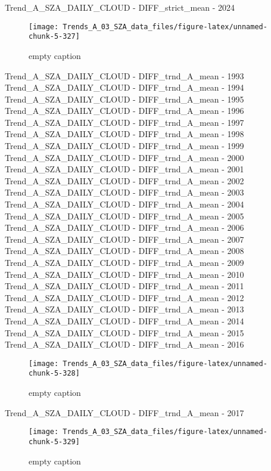 \documentclass[
  10pt,
  a4paper,oneside]{article}
\begin{document}
Trend\_A\_SZA\_DAILY\_CLOUD - DIFF\_strict\_mean - 2024

\begin{figure}[!ht]

{\centering \texttt{[image: Trends\_A\_03\_SZA\_data\_files/figure-latex/unnamed-chunk-5-327]} 

}

\caption{ empty caption }\label{fig:unnamed-chunk-5-327}
\end{figure}

Trend\_A\_SZA\_DAILY\_CLOUD - DIFF\_trnd\_A\_mean - 1993
Trend\_A\_SZA\_DAILY\_CLOUD - DIFF\_trnd\_A\_mean - 1994
Trend\_A\_SZA\_DAILY\_CLOUD - DIFF\_trnd\_A\_mean - 1995
Trend\_A\_SZA\_DAILY\_CLOUD - DIFF\_trnd\_A\_mean - 1996
Trend\_A\_SZA\_DAILY\_CLOUD - DIFF\_trnd\_A\_mean - 1997
Trend\_A\_SZA\_DAILY\_CLOUD - DIFF\_trnd\_A\_mean - 1998
Trend\_A\_SZA\_DAILY\_CLOUD - DIFF\_trnd\_A\_mean - 1999
Trend\_A\_SZA\_DAILY\_CLOUD - DIFF\_trnd\_A\_mean - 2000
Trend\_A\_SZA\_DAILY\_CLOUD - DIFF\_trnd\_A\_mean - 2001
Trend\_A\_SZA\_DAILY\_CLOUD - DIFF\_trnd\_A\_mean - 2002
Trend\_A\_SZA\_DAILY\_CLOUD - DIFF\_trnd\_A\_mean - 2003
Trend\_A\_SZA\_DAILY\_CLOUD - DIFF\_trnd\_A\_mean - 2004
Trend\_A\_SZA\_DAILY\_CLOUD - DIFF\_trnd\_A\_mean - 2005
Trend\_A\_SZA\_DAILY\_CLOUD - DIFF\_trnd\_A\_mean - 2006
Trend\_A\_SZA\_DAILY\_CLOUD - DIFF\_trnd\_A\_mean - 2007
Trend\_A\_SZA\_DAILY\_CLOUD - DIFF\_trnd\_A\_mean - 2008
Trend\_A\_SZA\_DAILY\_CLOUD - DIFF\_trnd\_A\_mean - 2009
Trend\_A\_SZA\_DAILY\_CLOUD - DIFF\_trnd\_A\_mean - 2010
Trend\_A\_SZA\_DAILY\_CLOUD - DIFF\_trnd\_A\_mean - 2011
Trend\_A\_SZA\_DAILY\_CLOUD - DIFF\_trnd\_A\_mean - 2012
Trend\_A\_SZA\_DAILY\_CLOUD - DIFF\_trnd\_A\_mean - 2013
Trend\_A\_SZA\_DAILY\_CLOUD - DIFF\_trnd\_A\_mean - 2014
Trend\_A\_SZA\_DAILY\_CLOUD - DIFF\_trnd\_A\_mean - 2015
Trend\_A\_SZA\_DAILY\_CLOUD - DIFF\_trnd\_A\_mean - 2016

\begin{figure}[!ht]

{\centering \texttt{[image: Trends\_A\_03\_SZA\_data\_files/figure-latex/unnamed-chunk-5-328]} 

}

\caption{ empty caption }\label{fig:unnamed-chunk-5-328}
\end{figure}

Trend\_A\_SZA\_DAILY\_CLOUD - DIFF\_trnd\_A\_mean - 2017

\begin{figure}[!ht]

{\centering \texttt{[image: Trends\_A\_03\_SZA\_data\_files/figure-latex/unnamed-chunk-5-329]} 

}

\caption{ empty caption }\label{fig:unnamed-chunk-5-329}
\end{figure}
\end{document}
